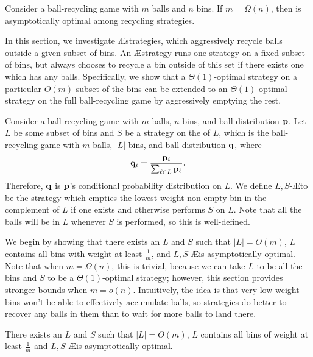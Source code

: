 \begin{corollary}\label{cor:rboptmanyballs}
	Consider a ball-recycling game with $m$ balls and $n$ bins.  If $m =
	\Omega(n)$, then \RB is asymptotically optimal among recycling strategies. 
\end{corollary}


In this section, we investigate \AE strategies, which aggressively recycle
balls outside a given subset of bins.  An \AE strategy runs one strategy on a
fixed subset of bins, but always chooses to recycle a bin outside of this set
if there exists one which has any balls.  Specifically, we show that a
$\Theta(1)$-optimal strategy on a particular $O(m)$ subset of the bins can be
extended to an $\Theta(1)$-optimal strategy on the full ball-recycling game by
aggressively emptying the
rest.

Consider a ball-recycling game with $m$ balls, $n$ bins, and ball distribution
$\mathbf{p}$. Let $L$ be some subset of bins and $S$ be a strategy on the  of $L$, which is the ball-recycling game with $m$ balls,
$|L|$ bins, and ball distribution $\mathbf{q}$, where 
\begin{equation*}
	\mathbf{q}_i = \frac{\mathbf{p}_i}{\sum_{\ell \in L} \mathbf{p}_\ell}.
\end{equation*}
Therefore, $\mathbf{q}$ is $\mathbf{p}$'s conditional probability distribution on $L$. We
define $L,S$-\AE to be the strategy which empties the lowest weight non-empty
bin in the complement of $L$ if one exists and otherwise performs $S$ on $L$.
Note that all the balls will be in $L$ whenever $S$ is performed, so this is
well-defined.

We begin by showing that there exists an $L$ and $S$ such that $|L|=O(m)$, $L$
contains all bins with weight at least $\frac{1}{m}$, and $L,S$-\AE is
asymptotically optimal. Note that when $m = \Omega(n)$, this is trivial,
because we can take $L$ to be all the bins and $S$ to be a $\Theta(1)$-optimal
strategy; however, this section provides stronger bounds when $m = o(n)$.
Intuitively, the idea is that very low weight bins won't be able to effectively
accumulate balls, so strategies do better to recover any balls in them than to
wait for more balls to land there.

\begin{lemma}\label{lem:aggroopt}
	There exists an $L$ and $S$ such that $|L|=O(m)$, $L$ contains all bins of
	weight at least $\frac{1}{m}$ and $L,S$-\AE is asymptotically optimal.
\end{lemma}

